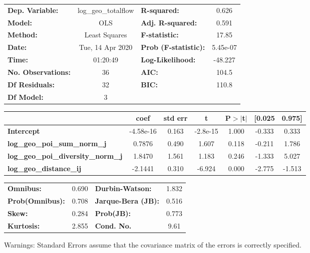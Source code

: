 \begin{center}
\begin{tabular}{lclc}
\toprule
\textbf{Dep. Variable:}                    & log\_geo\_totalflow & \textbf{  R-squared:         } &     0.626   \\
\textbf{Model:}                            &         OLS         & \textbf{  Adj. R-squared:    } &     0.591   \\
\textbf{Method:}                           &    Least Squares    & \textbf{  F-statistic:       } &     17.85   \\
\textbf{Date:}                             &   Tue, 14 Apr 2020  & \textbf{  Prob (F-statistic):} &  5.45e-07   \\
\textbf{Time:}                             &       01:20:49      & \textbf{  Log-Likelihood:    } &   -48.227   \\
\textbf{No. Observations:}                 &            36       & \textbf{  AIC:               } &     104.5   \\
\textbf{Df Residuals:}                     &            32       & \textbf{  BIC:               } &     110.8   \\
\textbf{Df Model:}                         &             3       & \textbf{                     } &             \\
\bottomrule
\end{tabular}
\begin{tabular}{lcccccc}
                                           & \textbf{coef} & \textbf{std err} & \textbf{t} & \textbf{P$> |$t$|$} & \textbf{[0.025} & \textbf{0.975]}  \\
\midrule
\textbf{Intercept}                         &    -4.58e-16  &        0.163     &  -2.8e-15  &         1.000        &       -0.333    &        0.333     \\
\textbf{log\_geo\_poi\_sum\_norm\_j}       &       0.7876  &        0.490     &     1.607  &         0.118        &       -0.211    &        1.786     \\
\textbf{log\_geo\_poi\_diversity\_norm\_j} &       1.8470  &        1.561     &     1.183  &         0.246        &       -1.333    &        5.027     \\
\textbf{log\_geo\_distance\_ij}            &      -2.1441  &        0.310     &    -6.924  &         0.000        &       -2.775    &       -1.513     \\
\bottomrule
\end{tabular}
\begin{tabular}{lclc}
\textbf{Omnibus:}       &  0.690 & \textbf{  Durbin-Watson:     } &    1.832  \\
\textbf{Prob(Omnibus):} &  0.708 & \textbf{  Jarque-Bera (JB):  } &    0.516  \\
\textbf{Skew:}          &  0.284 & \textbf{  Prob(JB):          } &    0.773  \\
\textbf{Kurtosis:}      &  2.855 & \textbf{  Cond. No.          } &     9.61  \\
\bottomrule
\end{tabular}
\end{center}

Warnings: \newline
 [1] Standard Errors assume that the covariance matrix of the errors is correctly specified.